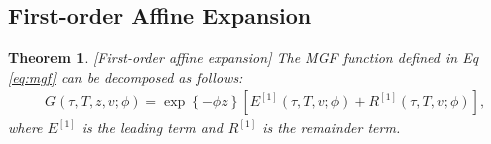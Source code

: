 \documentclass[pdftex,11pt,a4paper] {article}
\newtheorem{theorem}{Theorem}[section]
\begin{document}
\subsection{First-order Affine Expansion}
\begin{theorem}\label{thm:affine_expansion_ord1} [First-order affine expansion] The MGF function defined in Eq \eqref{eq:mgf} can be decomposed as follows:
\begin{equation}\label{eq:aff_expan_ord0}
\begin{split}
& G(\tau,T, z,v; \phi)= \exp \left\{-\phi z \right\} \left[ E^{[1]}(\tau,T, v; \phi) + R^{[1]}(\tau,T,v; \phi)\right],
\end{split}
\end{equation}
where $E^{[1]}$ is the leading term and $R^{[1]}$ is the remainder term.



\end{theorem}
\end{document}
